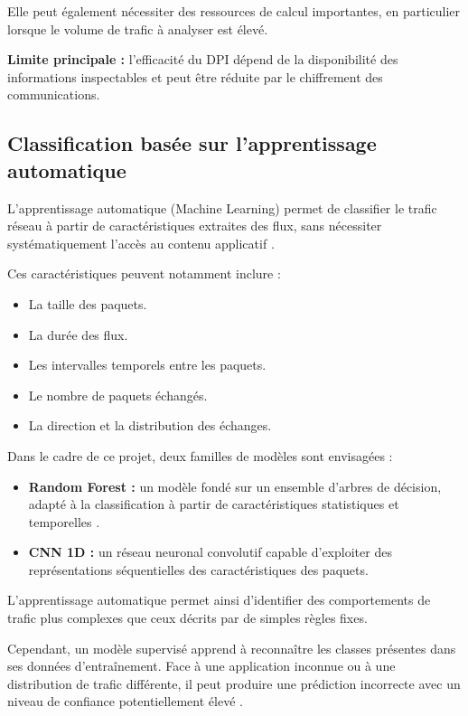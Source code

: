 Elle peut également nécessiter des ressources de calcul importantes,
en particulier lorsque le volume de trafic à analyser est élevé.

\textbf{Limite principale :} l'efficacité du DPI dépend de la
disponibilité des informations inspectables et peut être réduite
par le chiffrement des communications.

\subsection{Classification basée sur l'apprentissage automatique}

L'apprentissage automatique (Machine Learning) permet de classifier
le trafic réseau à partir de caractéristiques extraites des flux,
sans nécessiter systématiquement l'accès au contenu applicatif \cite{rezei2019}.

Ces caractéristiques peuvent notamment inclure :

\begin{itemize}
    \item La taille des paquets.
    \item La durée des flux.
    \item Les intervalles temporels entre les paquets.
    \item Le nombre de paquets échangés.
    \item La direction et la distribution des échanges.
\end{itemize}

Dans le cadre de ce projet, deux familles de modèles sont envisagées :

\begin{itemize}
    \item \textbf{Random Forest :} un modèle fondé sur un ensemble
    d'arbres de décision, adapté à la classification à partir de
    caractéristiques statistiques et temporelles \cite{breiman2001}.
    
    \item \textbf{CNN 1D :} un réseau neuronal convolutif capable
    d'exploiter des représentations séquentielles des caractéristiques
    des paquets.
\end{itemize}

L'apprentissage automatique permet ainsi d'identifier des comportements
de trafic plus complexes que ceux décrits par de simples règles
fixes.

Cependant, un modèle supervisé apprend à reconnaître les classes
présentes dans ses données d'entraînement. Face à une application
inconnue ou à une distribution de trafic différente, il peut
produire une prédiction incorrecte avec un niveau de confiance
potentiellement élevé \cite{scheirer2013,hendrycks2017}.

